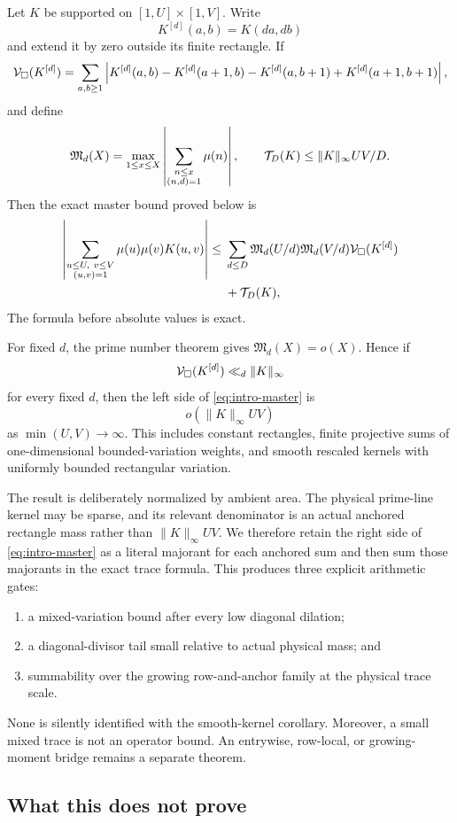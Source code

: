 Let \(K\) be supported on
\([1,U]\times[1,V]\).  Write
\[
 K^{[d]}(a,b)=K(da,db)
\]
and extend it by zero outside its finite rectangle.  If
\[
 \mathcal V_\square(K^{[d]})
 =
 \sum_{a,b\ge1}
 \left|
 K^{[d]}(a,b)-K^{[d]}(a+1,b)-K^{[d]}(a,b+1)
 +K^{[d]}(a+1,b+1)
 \right|,
\]
and define
\[
 \mathfrak M_d(X)=
 \max_{1\le x\le X}
 \left|\sum_{\substack{n\le x\\(n,d)=1}}\mu(n)\right|,
 \qquad
 \mathcal T_D(K)\le \|K\|_\infty UV/D.
\]
Then the exact master bound proved below is
\begin{align}
\left|
\sum_{\substack{u\le U,\ v\le V\\(u,v)=1}}
\mu(u)\mu(v)K(u,v)
\right|
\le{}&
\sum_{d\le D}
\mathfrak M_d(U/d)\mathfrak M_d(V/d)
\mathcal V_\square(K^{[d]})
\notag\\
&+\mathcal T_D(K),
\label{eq:intro-master}
\end{align}
The formula before absolute values is exact.

For fixed \(d\), the prime number theorem gives
\(\mathfrak M_d(X)=o(X)\).  Hence if
\[
 \mathcal V_\square(K^{[d]})\ll_d\|K\|_\infty
\]
for every fixed \(d\), then the left side of
\eqref{eq:intro-master} is
\[
 o(\|K\|_\infty UV)
\]
as \(\min(U,V)\to\infty\).  This includes constant rectangles,
finite projective sums of one-dimensional bounded-variation weights, and
smooth rescaled kernels with uniformly bounded rectangular variation.

The result is deliberately normalized by ambient area.  The physical
prime-line kernel may be sparse, and its relevant denominator is an actual
anchored rectangle mass rather than \(\|K\|_\infty UV\).  We therefore retain
the right side of \eqref{eq:intro-master} as a literal majorant for each
anchored sum and then sum those majorants in the exact trace formula.  This
produces three explicit arithmetic gates:
\begin{enumerate}[label=\textup{(\roman*)}]
 \item a mixed-variation bound after every low diagonal dilation;
 \item a diagonal-divisor tail small relative to actual physical mass; and
 \item summability over the growing row-and-anchor family at the physical
 trace scale.
\end{enumerate}
None is silently identified with the smooth-kernel corollary.
Moreover, a small mixed trace is not an operator bound.  An entrywise,
row-local, or growing-moment bridge remains a separate theorem.

\subsection{What this does not prove}

